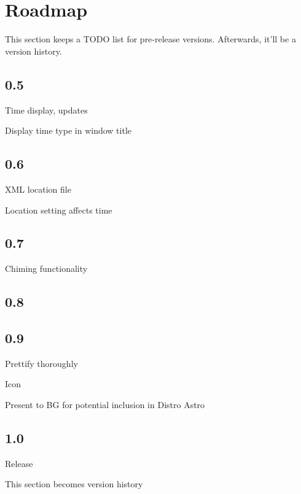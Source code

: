 \section{Roadmap}

This section keeps a TODO list for pre-release versions. Afterwards, it'll be a version history.

\subsection{0.5}

Time display, updates

Display time type in window title


\subsection{0.6}

XML location file

Location setting affects time

\subsection{0.7}

Chiming functionality

\subsection{0.8}


\subsection{0.9}

Prettify thoroughly

Icon

Present to BG for potential inclusion in Distro Astro

\subsection{1.0}

Release

This section becomes version history

